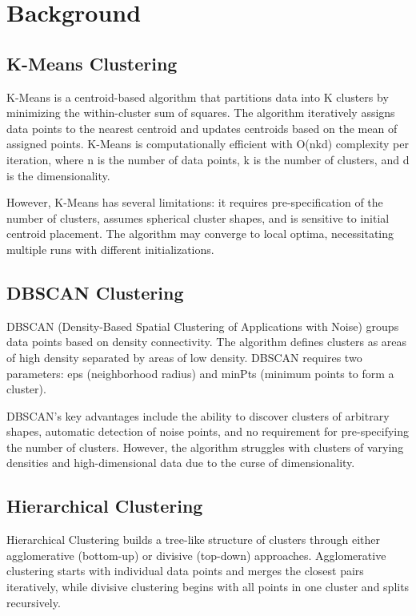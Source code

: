 \documentclass{COMPXXXX}
\begin{document}
\section{Background}

\subsection{K-Means Clustering}
K-Means is a centroid-based algorithm that partitions data into K clusters by minimizing the within-cluster sum of squares. The algorithm iteratively assigns data points to the nearest centroid and updates centroids based on the mean of assigned points. K-Means is computationally efficient with O(nkd) complexity per iteration, where n is the number of data points, k is the number of clusters, and d is the dimensionality.

However, K-Means has several limitations: it requires pre-specification of the number of clusters, assumes spherical cluster shapes, and is sensitive to initial centroid placement. The algorithm may converge to local optima, necessitating multiple runs with different initializations.

\subsection{DBSCAN Clustering}
DBSCAN (Density-Based Spatial Clustering of Applications with Noise) groups data points based on density connectivity. The algorithm defines clusters as areas of high density separated by areas of low density. DBSCAN requires two parameters: eps (neighborhood radius) and minPts (minimum points to form a cluster).

DBSCAN's key advantages include the ability to discover clusters of arbitrary shapes, automatic detection of noise points, and no requirement for pre-specifying the number of clusters. However, the algorithm struggles with clusters of varying densities and high-dimensional data due to the curse of dimensionality.

\subsection{Hierarchical Clustering}
Hierarchical Clustering builds a tree-like structure of clusters through either agglomerative (bottom-up) or divisive (top-down) approaches. Agglomerative clustering starts with individual data points and merges the closest pairs iteratively, while divisive clustering begins with all points in one cluster and splits recursively.
\end{document}
